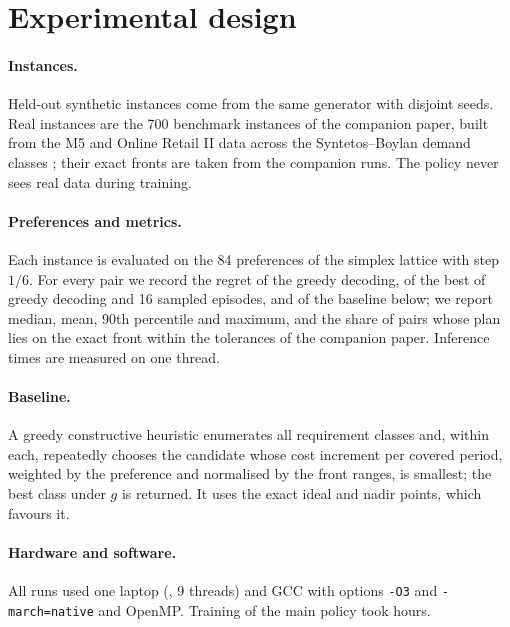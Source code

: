 \documentclass[preprint,12pt,authoryear]{elsarticle}
\begin{document}
\section{Experimental design}\label{sec:design}

\paragraph{Instances.}
Held-out synthetic instances come from the same generator with disjoint seeds. Real instances are
the 700 benchmark instances of the companion paper, built from the M5 \citep{Makridakis2022M5}
and Online Retail II \citep{Chen2012Retail} data across the Syntetos--Boylan demand classes
\citep{SyntetosBoylan2005}; their exact fronts are taken from the companion runs. The policy never
sees real data during training.

\paragraph{Preferences and metrics.}
Each instance is evaluated on the 84 preferences of the simplex lattice with step $1/6$. For every
pair we record the regret of the greedy decoding, of the best of greedy decoding and 16 sampled
episodes, and of the baseline below; we report median, mean, 90th percentile and maximum, and the
share of pairs whose plan lies on the exact front within the tolerances of the companion paper.
Inference times are measured on one thread.

\paragraph{Baseline.}
A greedy constructive heuristic enumerates all requirement classes and, within each, repeatedly
chooses the candidate whose cost increment per covered period, weighted by the preference and
normalised by the front ranges, is smallest; the best class under $g$ is returned. It uses the exact ideal and nadir points,
which favours it.

\paragraph{Hardware and software.}
All runs used one laptop (, 9 threads) and GCC  with options \texttt{-O3} and \texttt{-march=native} and
OpenMP. Training of the main policy took  hours.
\end{document}
